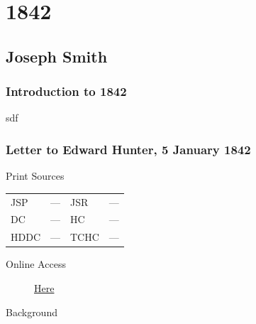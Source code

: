 \section{1842}

	\subsection{Joseph Smith}
		\label{EMS-1842-JS}

		\subsubsection{Introduction to 1842}
		
			sdf
			
		\subsubsection{Letter to Edward Hunter, 5 January 1842}
			\label{EMS-1842-JS-5-JAN-1842}
			
			\begin{description}
				\item[Print Sources]
			\end{description}

			\begin{tabular}{p{0.5in}p{1in}p{0.5in}p{1in}}
				JSP	 	& ---		& JSR 		& --- \\
				DC	 	& ---		& HC 		& --- \\
				HDDC 	& ---		& TCHC 		& --- \\
			\end{tabular}
			
			\begin{description}
				\item[Online Access] \href{https://www.josephsmithpapers.org/paper-summary/letter-to-edward-hunter-5-january-1842/1}{Here}
			\end{description}
			
			\begin{description}
				\item[Background]
			\end{description}
			

